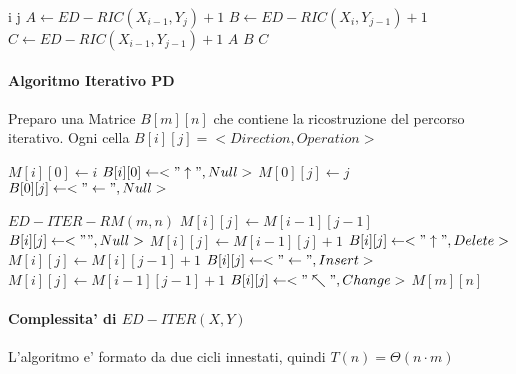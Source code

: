 \begin{algorithm}
    \begin{algorithmic}
                \State \Return i
                \State \Return j
            \Else
                \State $A \gets ED-RIC(X_{i-1}, Y_{j}) + 1$
                \State $B \gets ED-RIC(X_{i}, Y_{j-1}) + 1$
                \State $C \gets ED-RIC(X_{i-1}, Y_{j-1}) + 1$
                    \State \Return $A$
                    \State \Return $B$
                \Else
                    \State \Return $C$
                \EndIf
            \EndIf
        \EndProcedure
    \end{algorithmic}
\end{algorithm}

\paragraph{Algoritmo Iterativo PD}

Preparo una Matrice $B[m][n]$ che contiene la ricostruzione del percorso iterativo.
Ogni cella $B[i][j] = <Direction, Operation>$

\begin{algorithm}
    \begin{algorithmic}
                \State $M[i][0] \gets i$
                \State $B[i][0] \gets <"\uparrow", Null>$
            \EndFor
                \State $M[0][j] \gets j$
                \State $B[0][j] \gets <"\leftarrow", Null>$
            \EndFor
        \EndProcedure
    \end{algorithmic}
\end{algorithm}


\begin{algorithm}
    \begin{algorithmic}
            \State $ED-ITER-RM(m, n)$
                        \State $M[i][j] \gets M[i-1][j-1]$
                        \State $B[i][j] \gets <"", Null>$
                        \State $M[i][j] \gets M[i-1][j] + 1$
                        \State $B[i][j] \gets <"\uparrow", Delete>$
                        \State $M[i][j] \gets M[i][j-1] + 1$
                        \State $B[i][j] \gets <"\leftarrow", Insert>$
                    \Else
                        \State $M[i][j] \gets M[i-1][j-1] + 1$
                        \State $B[i][j] \gets <"\nwarrow", Change>$
                    \EndIf
                \EndFor
            \EndFor
            \State \Return $M[m][n]$
        \EndProcedure
    \end{algorithmic}
\end{algorithm}

\paragraph{Complessita' di $ED-ITER(X, Y)$}

L'algoritmo e' formato da due cicli innestati, quindi $T(n) = \Theta(n \cdot m)$
